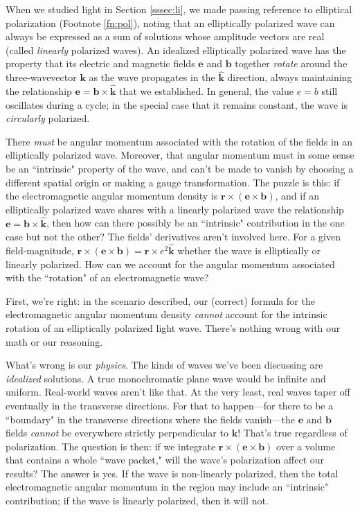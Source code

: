 \documentclass[12pt]{article}
\renewcommand{\vv}[1]{\mathbf{#1}}
\begin{document}
When we studied light in Section \ref{sssec:li}, we made passing reference to elliptical polarization (Footnote \ref{fn:pol}), noting that an elliptically polarized wave can always be expressed as a sum of solutions whose amplitude vectors are real (called \emph{linearly} polarized waves). An idealized elliptically polarized wave has the property that its electric and magnetic fields $\vv e$ and $\vv b$ together \emph{rotate} around the three-wavevector $\vv k$ as the wave propagates in the $\vv{\hat k}$ direction, always maintaining the relationship $\vv e = \vv b \times \vv{\hat k}$ that we established. In general, the value $e = b$ still oscillates during a cycle; in the special case that it remains constant, the wave is \emph{circularly} polarized.

There \emph{must} be angular momentum associated with the rotation of the fields in an elliptically polarized wave. Moreover, that angular momentum must in some sense be an ``intrinsic" property of the wave, and can't be made to vanish by choosing a different spatial origin or making a gauge transformation. The puzzle is this: if the electromagnetic angular momentum density is $\vv r \times (\vv e \times \vv b)$, and if an elliptically polarized wave shares with a linearly polarized wave the relationship ${\vv e = \vv b \times \vv{\hat k}}$, then how can there possibly be an ``intrinsic" contribution in the one case but not the other? The fields' derivatives aren't involved here. For a given field-magnitude, ${\vv r \times (\vv e \times \vv b) = \vv r \times e^2 \vv{\hat k}}$ whether the wave is elliptically or linearly polarized. How can we account for the angular momentum associated with the ``rotation" of an electromagnetic wave?

First, we're right: in the scenario described, our (correct) formula for the electromagnetic angular momentum density \emph{cannot} account for the intrinsic rotation of an elliptically polarized light wave. There's nothing wrong with our math or our reasoning.

What's wrong is our \emph{physics}. The kinds of waves we've been discussing are \emph{idealized} solutions. A true monochromatic plane wave would be infinite and uniform. Real-world waves aren't like that. At the very least, real waves taper off eventually in the transverse directions. For that to happen---for there to be a ``boundary" in the transverse directions where the fields vanish---the $\vv e$ and $\vv b$ fields \emph{cannot} be everywhere strictly perpendicular to $\vv k$! That's true regardless of polarization. The question is then: if we integrate $\vv r \times (\vv e \times \vv b)$ over a volume that contains a whole ``wave packet," will the wave's polarization affect our results? The answer is yes. If the wave is non-linearly polarized, then the total electromagnetic angular momentum in the region may include an ``intrinsic" contribution; if the wave is linearly polarized, then it will not.
\end{document}
